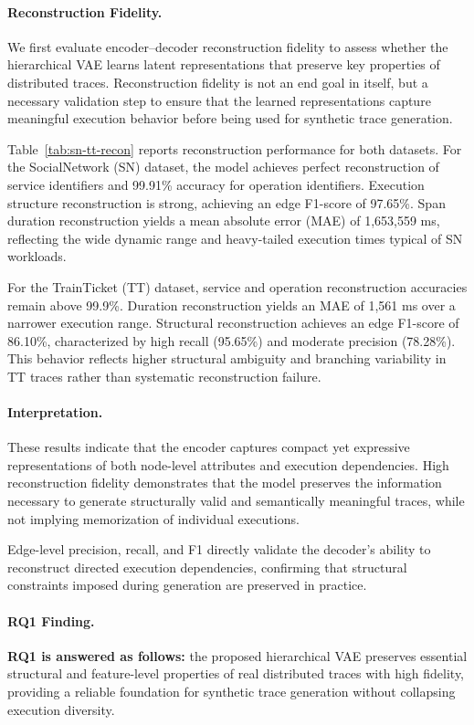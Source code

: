 \documentclass[sigconf,review]{acmart}
\begin{document}
\paragraph{Reconstruction Fidelity.}
We first evaluate encoder--decoder reconstruction fidelity to assess whether the hierarchical VAE learns latent representations that preserve key properties of distributed traces. Reconstruction fidelity is not an end goal in itself, but a necessary validation step to ensure that the learned representations capture meaningful execution behavior before being used for synthetic trace generation.

Table~\ref{tab:sn-tt-recon} reports reconstruction performance for both datasets. For the SocialNetwork (SN) dataset, the model achieves perfect reconstruction of service identifiers and 99.91\% accuracy for operation identifiers. Execution structure reconstruction is strong, achieving an edge F1-score of 97.65\%. Span duration reconstruction yields a mean absolute error (MAE) of 1,653,559 ms, reflecting the wide dynamic range and heavy-tailed execution times typical of SN workloads.

For the TrainTicket (TT) dataset, service and operation reconstruction accuracies remain above 99.9\%. Duration reconstruction yields an MAE of 1,561 ms over a narrower execution range. Structural reconstruction achieves an edge F1-score of 86.10\%, characterized by high recall (95.65\%) and moderate precision (78.28\%). This behavior reflects higher structural ambiguity and branching variability in TT traces rather than systematic reconstruction failure.

\paragraph{Interpretation.}
These results indicate that the encoder captures compact yet expressive representations of both node-level attributes and execution dependencies. High reconstruction fidelity demonstrates that the model preserves the information necessary to generate structurally valid and semantically meaningful traces, while not implying memorization of individual executions.

Edge-level precision, recall, and F1 directly validate the decoder’s ability to reconstruct directed execution dependencies, confirming that structural constraints imposed during generation are preserved in practice.


\paragraph{RQ1 Finding.}
\textbf{RQ1 is answered as follows:} the proposed hierarchical VAE preserves essential structural and feature-level properties of real distributed traces with high fidelity, providing a reliable foundation for synthetic trace generation without collapsing execution diversity.
\end{document}
